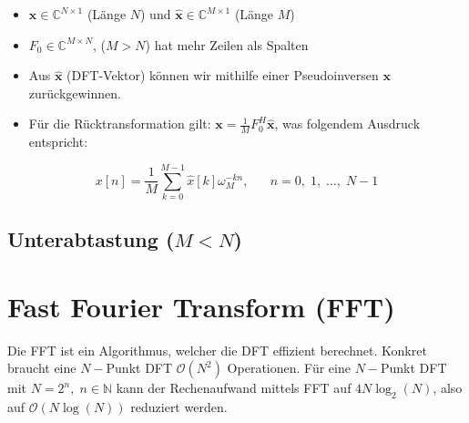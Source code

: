 \documentclass[11pt]{article}
\begin{document}
\begin{itemize}
    \item $\mathbf{x} \in \mathbb{C}^{N \times 1}$ (Länge $N$) und $\hat{\mathbf{x}} \in \mathbb{C}^{M \times 1}$ (Länge $M$)
    \item $F_0 \in \mathbb{C}^{M\times N}$, ($M > N$) hat mehr Zeilen als Spalten
    \item Aus $\hat{\mathbf{x}}$ (DFT-Vektor) können wir mithilfe einer Pseudoinversen $\mathbf{x}$ zurückgewinnen.
    \item Für die Rücktransformation gilt: $\mathbf{x} = \displaystyle\frac{1}{M} F_0^H \hat{\mathbf{x}}$, was folgendem Ausdruck entspricht:
\end{itemize}
$$x[n] = \frac{1}{M} \sum_{k=0}^{M-1} \hat{x}[k]\omega_M^{-kn}, \hspace{20pt} n = 0, \; 1, \; \dots, \; N-1$$


\subsection*{Unterabtastung ($M < N$)}
\vspace*{-0.5cm}

\vfill \null
\pagebreak

\section*{Fast Fourier Transform (FFT)}
\vspace*{-0.5cm}
Die FFT ist ein Algorithmus, welcher die DFT effizient berechnet. Konkret braucht eine $N-$Punkt DFT $\mathcal{O}(N^2)$ Operationen. Für eine $N-$Punkt DFT mit $N=2^n, \; n \in \mathbb{N}$ kann der Rechenaufwand mittels FFT auf $4N \log_2(N)$, also auf $\mathcal{O}(N\log(N))$ reduziert werden.

\end{document}
